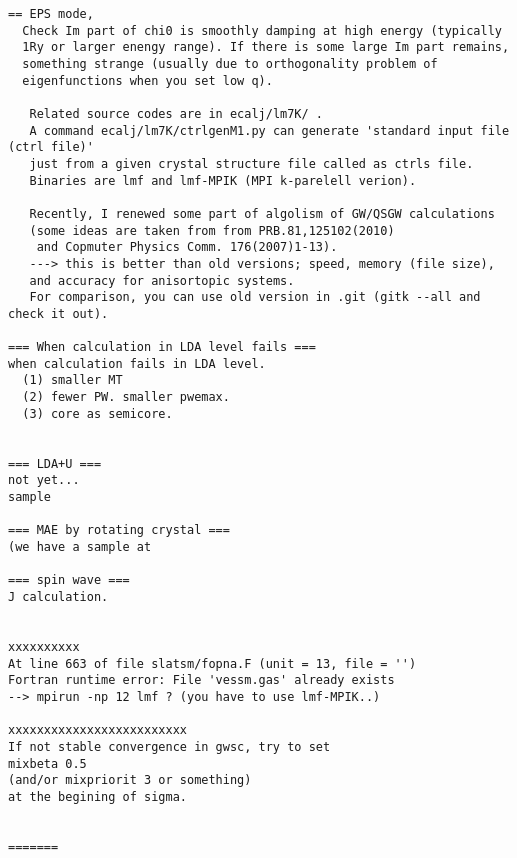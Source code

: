 \documentclass[a4paper,10pt,epsf,fleqn]{article}
\begin{document}
\begin{verbatim}
== EPS mode,
  Check Im part of chi0 is smoothly damping at high energy (typically
  1Ry or larger enengy range). If there is some large Im part remains,
  something strange (usually due to orthogonality problem of
  eigenfunctions when you set low q).

   Related source codes are in ecalj/lm7K/ .
   A command ecalj/lm7K/ctrlgenM1.py can generate 'standard input file (ctrl file)' 
   just from a given crystal structure file called as ctrls file. 
   Binaries are lmf and lmf-MPIK (MPI k-parelell verion).

   Recently, I renewed some part of algolism of GW/QSGW calculations
   (some ideas are taken from from PRB.81,125102(2010) 
    and Copmuter Physics Comm. 176(2007)1-13).
   ---> this is better than old versions; speed, memory (file size),
   and accuracy for anisortopic systems.
   For comparison, you can use old version in .git (gitk --all and check it out).

=== When calculation in LDA level fails ===
when calculation fails in LDA level.
  (1) smaller MT
  (2) fewer PW. smaller pwemax.
  (3) core as semicore.


=== LDA+U ===
not yet...
sample

=== MAE by rotating crystal ===
(we have a sample at

=== spin wave ===
J calculation.


xxxxxxxxxx
At line 663 of file slatsm/fopna.F (unit = 13, file = '')
Fortran runtime error: File 'vessm.gas' already exists
--> mpirun -np 12 lmf ? (you have to use lmf-MPIK..)

xxxxxxxxxxxxxxxxxxxxxxxxx
If not stable convergence in gwsc, try to set
mixbeta 0.5
(and/or mixpriorit 3 or something)
at the begining of sigma.


=======
\end{verbatim}
\end{document}
